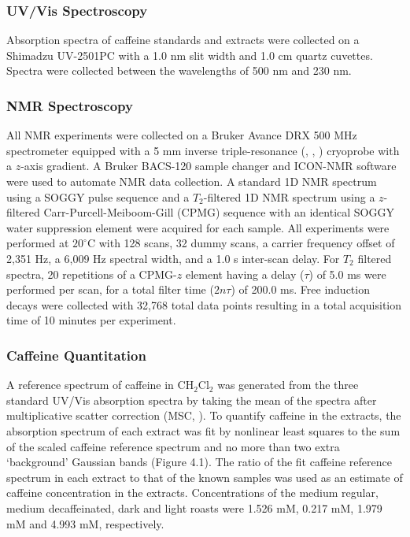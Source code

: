 \subsubsection{UV/Vis Spectroscopy}

\begin{doublespace}
Absorption spectra of caffeine standards and extracts were collected on a
Shimadzu UV-2501PC with a 1.0 nm slit width and 1.0 cm quartz cuvettes. Spectra
were collected between the wavelengths of 500 nm and 230 nm.
\end{doublespace}

\subsubsection{NMR Spectroscopy}

\begin{doublespace}
All NMR experiments were collected on a Bruker Avance DRX 500 MHz spectrometer
equipped with a 5 mm inverse triple-resonance (\hnmr{}, \cnmr{}, \nnmr{})
cryoprobe with a $z$-axis gradient. A Bruker BACS-120 sample changer and
ICON-NMR software were used to automate NMR data collection. A standard 1D
\hnmr{} NMR spectrum using a SOGGY pulse sequence
\cite{hwang:jmr1995,nguyen:jmr2007} and a $T_2$-filtered 1D \hnmr{} NMR
spectrum using a $z$-filtered Carr-Purcell-Meiboom-Gill (CPMG) sequence
\cite{rastrelli:jacs2009} with an identical SOGGY water suppression element
were acquired for each sample. All experiments were performed at $20^\circ$C
with 128 scans, 32 dummy scans, a carrier frequency offset of 2,351 Hz, a
6,009 Hz spectral width, and a 1.0 s inter-scan delay. For $T_2$ filtered
spectra, 20 repetitions of a CPMG-$z$ element having a delay ($\tau$) of 5.0
ms were performed per scan, for a total filter time ($2n\tau$) of 200.0 ms.
Free induction decays were collected with 32,768 total data points resulting
in a total acquisition time of 10 minutes per experiment.
\end{doublespace}

\subsubsection{Caffeine Quantitation}

\begin{doublespace}
A reference spectrum of caffeine in CH$_2$Cl$_2$ was generated from the three
standard UV/Vis absorption spectra by taking the mean of the spectra after
multiplicative scatter correction (MSC, \cite{fearn:cils2009}). To quantify
caffeine in the extracts, the absorption spectrum of each extract was fit by
nonlinear least squares \cite{marquardt:jsiam1963} to the sum of the scaled
caffeine reference spectrum and no more than two extra `background' Gaussian
bands (Figure 4.1). The ratio of the fit caffeine reference spectrum in each
extract to that of the known samples was used as an estimate of caffeine
concentration in the extracts. Concentrations of the medium regular, medium
decaffeinated, dark and light roasts were 1.526 mM, 0.217 mM, 1.979 mM and
4.993 mM, respectively.
\end{doublespace}


